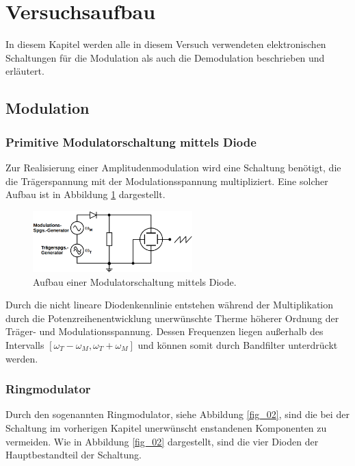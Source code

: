 \section{Versuchsaufbau}
\label{sec:Versuchaufbau}
In diesem Kapitel werden alle in diesem Versuch verwendeten elektronischen Schaltungen für die Modulation als auch die Demodulation beschrieben und erläutert.
\subsection{Modulation}
\subsubsection{Primitive Modulatorschaltung mittels Diode}
\label{sec:Primitive_Modulatorschaltung_mittels_Diode}
Zur Realisierung einer Amplitudenmodulation wird eine Schaltung benötigt, die die Trägerspannung mit der Modulationsspannung multipliziert. Eine solcher Aufbau ist in Abbildung \ref{fig_10} dargestellt.

\begin{figure}
    \centering
    \includegraphics[width=0.55\textwidth]{ressources/A10.png}
    \caption{Aufbau einer Modulatorschaltung mittels Diode\cite{skript}.}
    \label{fig_10}
\end{figure}

Durch die nicht lineare Diodenkennlinie entstehen während der Multiplikation durch die Potenzreihenentwicklung unerwünschte Therme höherer Ordnung der Träger- und Modulationsspannung. Dessen Frequenzen liegen außerhalb des Intervalls $[\omega_T-\omega_M, \omega_T+\omega_M]$ und können somit durch Bandfilter unterdrückt werden.

\subsubsection{Ringmodulator}
\label{sec:Ringmodulator}
Durch den sogenannten Ringmodulator, siehe Abbildung \ref{fig_02}, sind die bei der Schaltung im vorherigen Kapitel unerwünscht enstandenen Komponenten zu vermeiden. Wie in Abbildung \ref{fig_02} dargestellt, sind die vier Dioden der Hauptbestandteil der Schaltung. 

